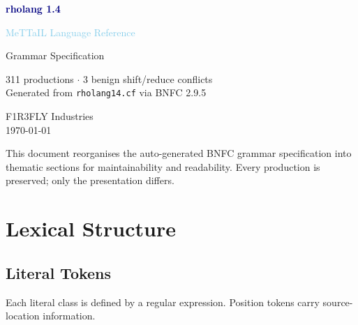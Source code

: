 \documentclass[11pt,a4paper]{article}
\begin{document}
\begin{titlepage}
\centering
\vspace*{4cm}
{\Huge\bfseries\textcolor{navy}{rholang 1.4}\par}
\vspace{0.4cm}
{\LARGE\textcolor{skyblue}{MeTTaIL Language Reference}\par}
\vspace{1.5cm}
{\large Grammar Specification\par}
\vspace{0.5cm}
{\normalsize
  311 productions $\cdot$ 3 benign shift/reduce conflicts\\[4pt]
  Generated from \texttt{rholang14.cf} via BNFC 2.9.5\par}
\vspace{2cm}
{\small
  F1R3FLY Industries\\[2pt]
  \today\par}
\vfill
{\footnotesize
  This document reorganises the auto-generated BNFC grammar specification
  into thematic sections for maintainability and readability.  Every
  production is preserved; only the presentation differs.\par}
\end{titlepage}

\tableofcontents
\clearpage

\section{Lexical Structure}
\label{sec:lexical}

\subsection{Literal Tokens}

Each literal class is defined by a regular expression.
Position tokens carry source-location information.
\end{document}
